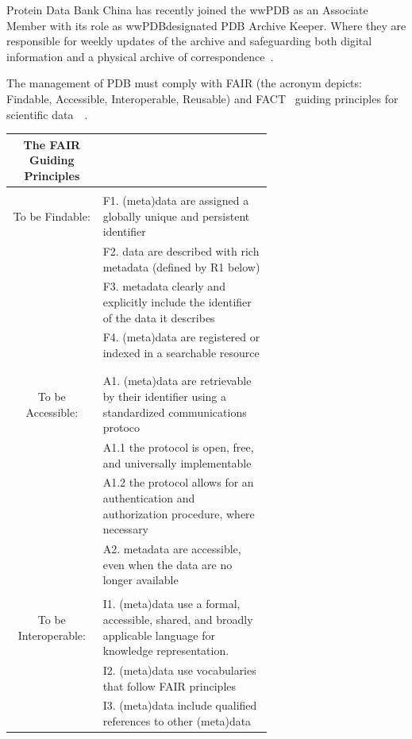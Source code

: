 \documentclass[]{final_report}
\begin{document}
Protein Data Bank China has recently joined the wwPDB as an Associate Member with its role as wwPDBdesignated PDB Archive Keeper. Where they are responsible for weekly updates of the archive and safeguarding both digital information and a physical archive of correspondence~\cite{burley1_rcsb_2022}.

The management of PDB must comply with FAIR (the acronym depicts: Findable, Accessible, Interoperable, Reusable) and FACT~\cite{van_der_aalst_responsible_2017} guiding principles for scientific data~\cite{wilkinson_fair_2016}~\cite{westbrook_impact_2020}.

\begin{table}[h!]
    \begin{center}
    \label{tab:FAIR}
        \begin{tabular}{c|p{0.65\linewidth}}
        The FAIR Guiding Principles\\
        \hline
        \\
        To be Findable: & F1. (meta)data are assigned a globally unique and persistent identifier\\
        & F2. data are described with rich metadata (defined by R1 below)\\ & F3. metadata clearly and explicitly include the identifier of the data it describes\\ & F4. (meta)data are registered or indexed in a searchable resource\\
        \\
        \hline
        \\
        To be Accessible: & A1. (meta)data are retrievable by their identifier using a standardized communications protoco\\
        & A1.1 the protocol is open, free, and universally implementable\\ & A1.2 the protocol allows for an authentication and authorization procedure, where necessary\\ & A2. metadata are accessible, even when the data are no longer available
        \\
        \hline
        \\
        To be Interoperable: & I1. (meta)data use a formal, accessible, shared, and broadly applicable language for knowledge representation.\\
        & I2. (meta)data use vocabularies that follow FAIR principles\\ & I3. (meta)data include qualified references to other (meta)data\\

\end{tabular}
\end{center}
\end{table}
\end{document}
